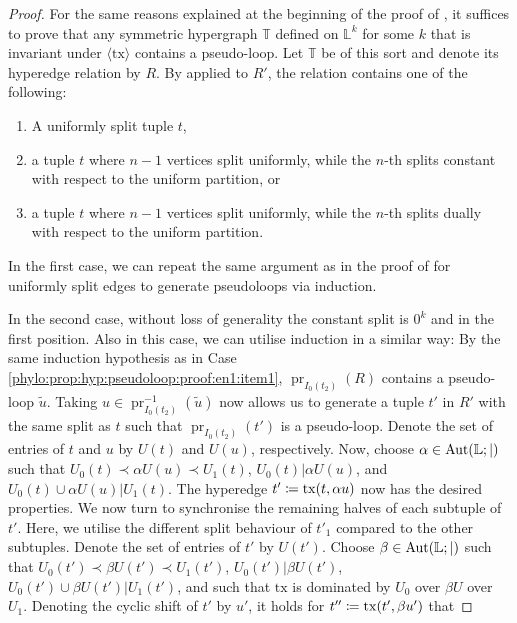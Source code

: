 \documentclass[a4paper,reqno, cleveref]{amsart}
\newcommand{\coloneqq}{\mathrel{\mathop:}\mathrel{\mkern-1.2mu}=}
\newcommand{\struct}[1]{\mathbb{#1}}
\DeclareMathOperator{\pr}{pr}
\DeclareMathOperator{\Aut}{Aut}
\newcommand{\sL}{\mathbb L}
\newcommand{\sT}{\mathbb T}
\newcommand{\gen}[1]{\langle#1\rangle}
\newcommand{\Phylo}[1]{\ensuremath{(\struct{L};|)}#1}
\newcommand{\tx}{\ensuremath{\mathrm{tx}}\xspace}
\newcommand{\hyp}{\ensuremath{R}\xspace}
\newcommand\mo[1]{\textcolor{black}{#1}} %
\begin{document}
\begin{proof}%
    For the same reasons explained at the beginning of the proof of , it suffices to prove that any symmetric hypergraph $\sT$ defined on $\sL^k$ for some $k$ that is invariant under $\gen{\tx}$ contains a pseudo-loop. 
    Let $\sT$ be of this sort and denote its hyperedge relation by $\hyp$.
    By  applied to $\hyp'$, the relation contains one of the following: 
    \begin{enumerate}
        \item\label{phylo:prop:hyp:pseudoloop:proof:en1:item1} A uniformly split tuple $t$,
        \item\label{phylo:prop:hyp:pseudoloop:proof:en1:item2} a tuple $t$ where $n-1$ vertices split uniformly, while the $n$-th splits constant with respect to the uniform partition, or 
        \item\label{phylo:prop:hyp:pseudoloop:proof:en1:item3} a tuple $t$ where $n-1$ vertices split uniformly, while the $n$-th splits dually with respect to the uniform partition. 
    \end{enumerate}
    
    In the first case, we can repeat the same argument as in the proof of  for uniformly split edges to generate pseudoloops via induction.
    
    In the second case, without loss of generality the constant split is $0^k$ and in the first position.
    Also in this case, we can utilise induction in a similar way:
    By the same induction hypothesis as in Case \ref{phylo:prop:hyp:pseudoloop:proof:en1:item1}, $\pr_{I_0(t_2)}(\hyp)$ contains a pseudo-loop $\tilde u$.
    Taking $u\in\pr_{I_0(t_2)}^{-1}(\tilde u)$ now allows us to generate a tuple $t'$ in $\hyp'$ with the same split as $t$ such that $\pr_{I_0(t_2)}(t')$ is a pseudo-loop. 
    Denote the set of entries of $t$ and $u$ by $U(t)$ and $U(u)$, respectively. Now, choose $\alpha\in\Aut\Phylo$ such that $U_0(t)\prec \alpha U(u)\prec U_1(t)$, $U_0(t)|\alpha U(u)$, and $U_0(t)\cup\alpha U(u)|U_1(t)$. 
    The hyperedge $t'\coloneqq\tx(t,\alpha u)$ now has the desired properties. 
    We now turn to synchronise the remaining halves of each subtuple of $t'$. 
    Here, we utilise the different split behaviour of $t'_1$ compared to the other subtuples. 
    Denote the set of entries of $t'$ by $U(t')$. 
    Choose $\beta\in\Aut\Phylo$ such that $U_0(t')\prec\beta U(t')\prec U_1(t')$, $U_0(t')|\beta U(t')$, $U_0(t')\cup \beta U(t')| U_1(t')$, and such that $\tx$ is dominated by $U_0$ over $\beta U$ over $U_1$.
    Denoting the cyclic shift of $t'$ by $u'$, it holds for $t''\coloneqq\tx(t',\beta u')$ that 


\end{proof}
\end{document}
